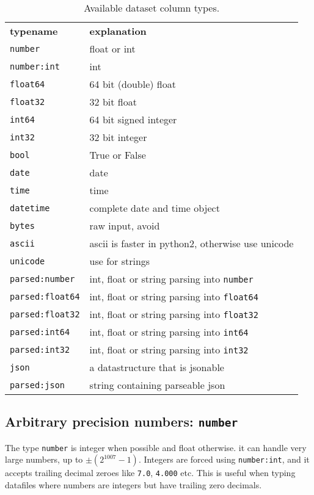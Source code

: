 \begin{table}[h!]
 \begin{tabular*}{\textwidth}{l @{\extracolsep{\fill}} l}
  \hline
   \textbf{typename}   & \textbf{explanation} \\[1ex]
   \texttt{number}     &  float or int\\
   \texttt{number:int} &  int\\[1ex]
   \texttt{float64}   &  64 bit (double) float\\
   \texttt{float32}   &  32 bit float\\
   \texttt{int64}     &  64 bit signed integer\\
   \texttt{int32}     &  32 bit integer\\[1ex]
   \texttt{bool}      &  True or False\\[1ex]
   \texttt{date}      &  date\\
   \texttt{time}      &  time\\
   \texttt{datetime}  &  complete date and time object\\[1ex]
   \texttt{bytes}     &  raw input, avoid \\
   \texttt{ascii}     &  ascii is faster in python2, otherwise use unicode\\
   \texttt{unicode}   &  use for strings\\[1ex]
   \texttt{parsed:number}   & int, float or string parsing into \texttt{number} \\
   \texttt{parsed:float64}  & int, float or string parsing into \texttt{float64} \\
   \texttt{parsed:float32}  & int, float or string parsing into \texttt{float32} \\
   \texttt{parsed:int64}    & int, float or string parsing into \texttt{int64} \\
   \texttt{parsed:int32}    & int, float or string parsing into \texttt{int32} \\[1ex]
   \texttt{json}            &  a datastructure that is jsonable\\
   \texttt{parsed:json}     &  string containing parseable json\\[1ex]
   \hline
 \end{tabular*}
 \caption{Available dataset column types.}
 \label{tab:types}
\end{table}


\subsection{Arbitrary precision numbers:  \texttt{number}}
The type \texttt{number} is integer when possible and float otherwise.
it can handle very large numbers, up to $\pm (2^{1007}-1)$.  Integers
are forced using \texttt{number:int}, and it accepts trailing decimal
zeroes like \texttt{7.0}, \texttt{4.000} etc.  This is useful when
typing datafiles where numbers are integers but have trailing zero
decimals.

